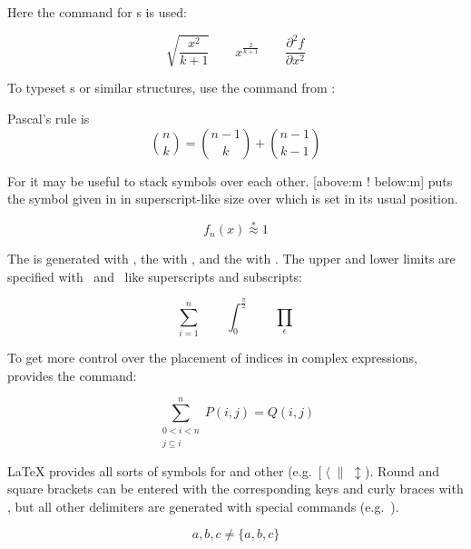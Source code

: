 Here the  command for s is used:
\begin{example}
\begin{equation*} 
  \sqrt{\frac{x^2}{k+1}}\qquad
  x^\frac{2}{k+1}\qquad
  \frac{\partial^2f}
  {\partial x^2} 
\end{equation*}
\end{example}

To typeset s or similar structures, use
the command  from :
\begin{example}
Pascal's rule is
\begin{equation*}
 \binom{n}{k} =\binom{n-1}{k}
 + \binom{n-1}{k-1}
\end{equation*}
\end{example}

For  it may be useful to stack symbols over each other.
[above:m ! below:m] puts the symbol given%
in  in superscript-like size over  which
is set in its usual position.
\begin{example}
\begin{equation*}
 f_n(x) \stackrel{*}{\approx} 1
\end{equation*}
\end{example}

The \emph{} is generated with , the
\emph{} with , and the \emph{}
with . The upper and lower limits are specified with~\ai{\^{}}
and~\ai{\_} like superscripts and subscripts:
\begin{example}
\begin{equation*}
\sum_{i=1}^n \qquad
\int_0^{\frac{\pi}{2}} \qquad
\prod_\epsilon
\end{equation*}
\end{example}

To get more control over the placement of indices in complex
expressions,  provides the  command:
\begin{example}
\begin{equation*}
\sum^n_{\substack{0<i<n \\ 
        j\subseteq i}}
   P(i,j) = Q(i,j)
\end{equation*}
\end{example}



\LaTeX{} provides all sorts of symbols for \emph{} and other
\emph{} (e.g.~$[\;\langle\;\|\;\updownarrow$). %
Round and square brackets can be entered with the corresponding keys and
curly braces with \ci{\{}, but all other delimiters are generated with
special commands (e.g.~).
\begin{example}
\begin{equation*}
{a,b,c} \neq \{a,b,c\}
\end{equation*}
\end{example}

